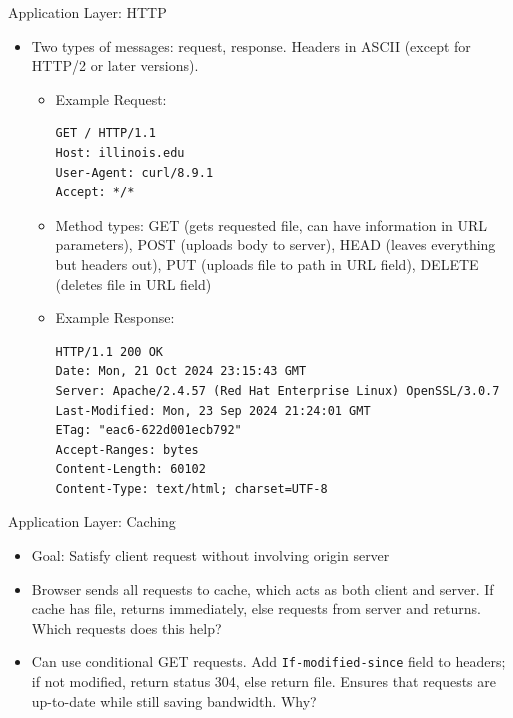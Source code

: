 \documentclass{beamer}
\begin{document}
\begin{frame}[fragile, t]{Application Layer: HTTP}
    \begin{itemize}
        \item Two types of messages: \alert{request}, \alert{response}. Headers in ASCII (except for HTTP/2 or later versions).
        \begin{itemize}
            \item Example Request: {\small \begin{verbatim}
GET / HTTP/1.1
Host: illinois.edu
User-Agent: curl/8.9.1
Accept: */*
            \end{verbatim}}
            \item \pause Method types: GET (gets requested file, can have information in URL parameters), POST (uploads body to server), HEAD (leaves everything but headers out), PUT (uploads file to path in URL field), DELETE (deletes file in URL field)
            \vspace{.5cm}
            \item \pause Example Response: {\small \begin{verbatim}
HTTP/1.1 200 OK
Date: Mon, 21 Oct 2024 23:15:43 GMT
Server: Apache/2.4.57 (Red Hat Enterprise Linux) OpenSSL/3.0.7
Last-Modified: Mon, 23 Sep 2024 21:24:01 GMT
ETag: "eac6-622d001ecb792"
Accept-Ranges: bytes
Content-Length: 60102
Content-Type: text/html; charset=UTF-8
            \end{verbatim}}
        \end{itemize}
    \end{itemize}
\end{frame}

\begin{frame}[t]{Application Layer: Caching}
    \begin{itemize}
        \item \alert{Goal}: Satisfy client request without involving origin server
        \item \pause Browser sends all requests to cache, which acts as both client and server. If cache has file, returns immediately, else requests from server and returns. \alert{Which requests does this help?}
        \item \pause Can use \alert{conditional GET requests}. Add \texttt{If-modified-since} field to headers; if not modified, return status 304, else return file. Ensures that requests are up-to-date while still saving bandwidth. \alert{Why?}
    \end{itemize}
\end{frame}
\end{document}
